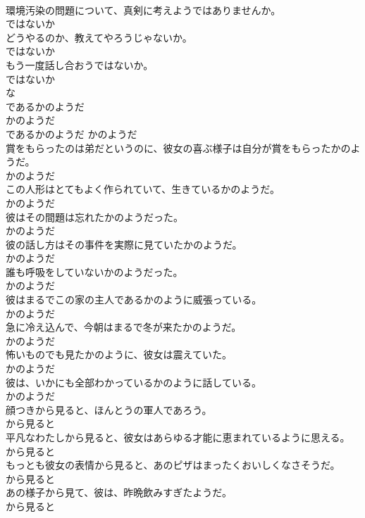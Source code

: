 \documentclass[8pt]{extreport}
\begin{document}
\begin{CJK}{UTF8}{min}
\\	環境汚染の問題について、真剣に考えようではありませんか。	
\\	ではないか	
\\	どうやるのか、教えてやろうじゃないか。	
\\	ではないか	
\\	もう一度話し合おうではないか。	
\\	ではないか	
\\	な
\\	であるかのようだ	
\\	かのようだ	
\\	であるかのようだ	かのようだ	
\\	賞をもらったのは弟だというのに、彼女の喜ぶ様子は自分が賞をもらったかのようだ。	
\\	かのようだ	
\\	この人形はとてもよく作られていて、生きているかのようだ。	
\\	かのようだ	
\\	彼はその間題は忘れたかのようだった。	
\\	かのようだ	
\\	彼の話し方はその事件を実際に見ていたかのようだ。	
\\	かのようだ	
\\	誰も呼吸をしていないかのようだった。	
\\	かのようだ	
\\	彼はまるでこの家の主人であるかのように威張っている。	
\\	かのようだ	
\\	急に冷え込んで、今朝はまるで冬が来たかのようだ。	
\\	かのようだ	
\\	怖いものでも見たかのように、彼女は震えていた。	
\\	かのようだ	
\\	彼は、いかにも全部わかっているかのように話している。	
\\	かのようだ	
\\	顔つきから見ると、ほんとうの軍人であろう。	
\\	から見ると	
\\	平凡なわたしから見ると、彼女はあらゆる才能に恵まれているように思える。	
\\	から見ると	
\\	もっとも彼女の表情から見ると、あのピザはまったくおいしくなさそうだ。	
\\	から見ると	
\\	あの様子から見て、彼は、昨晩飲みすぎたようだ。	
\\	から見ると	

\end{CJK}
\end{document}
